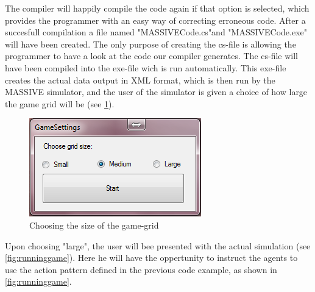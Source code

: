 The compiler will happily compile the code again if that option is selected, which provides the programmer with an easy way of correcting erroneous code. After a succesfull compilation a file named "MASSIVECode.cs"and "MASSIVECode.exe" will have been created. The only purpose of creating the cs-file is allowing the programmer to have a look at the code our compiler generates. The cs-file will have been compiled into the exe-file wich is run automatically. This exe-file creates the actual data output in XML format, which is then run by the MASSIVE simulator, and the user of the simulator is given a choice of how large the game grid will be (see \ref{fig:game_promt}).

\begin{figure}[h]%
\begin{center}
\includegraphics[width=\columnwidth]{images/massive_dialog.png}%
\end{center}
\caption{Choosing the size of the game-grid}%
\label{fig:game_promt}%
\end{figure}

Upon choosing "large", the user will bee presented with the actual simulation (see \ref{fig:runninggame}). Here he will have the oppertunity to instruct the agents to use the action pattern defined in the previous code example, as shown in \ref{fig:runninggame}.

